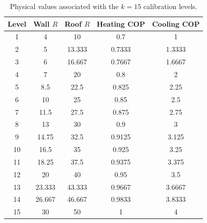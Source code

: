 
\begin{table}[t]
\centering
\caption{Physical values associated with the $k=15$ calibration levels.}
\label{tab:calibration_parameter_values}
\begin{tabular}{ccccc}
\toprule
Level & Wall $R$ & Roof $R$ & Heating COP & Cooling COP \\
\midrule
1 & 4 & 10 & 0.7 & 1 \\
2 & 5 & 13.333 & 0.7333 & 1.3333 \\
3 & 6 & 16.667 & 0.7667 & 1.6667 \\
4 & 7 & 20 & 0.8 & 2 \\
5 & 8.5 & 22.5 & 0.825 & 2.25 \\
6 & 10 & 25 & 0.85 & 2.5 \\
7 & 11.5 & 27.5 & 0.875 & 2.75 \\
8 & 13 & 30 & 0.9 & 3 \\
9 & 14.75 & 32.5 & 0.9125 & 3.125 \\
10 & 16.5 & 35 & 0.925 & 3.25 \\
11 & 18.25 & 37.5 & 0.9375 & 3.375 \\
12 & 20 & 40 & 0.95 & 3.5 \\
13 & 23.333 & 43.333 & 0.9667 & 3.6667 \\
14 & 26.667 & 46.667 & 0.9833 & 3.8333 \\
15 & 30 & 50 & 1 & 4 \\

\bottomrule
\end{tabular}
\end{table}
